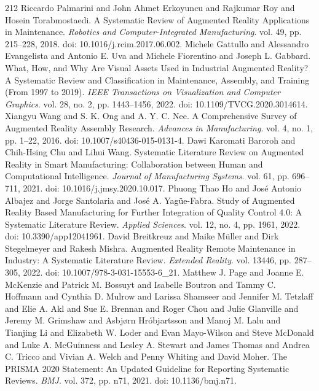 \begin{thebibliography}{212}
 Riccardo Palmarini and John Ahmet Erkoyuncu and Rajkumar Roy and Hosein Torabmostaedi. A Systematic Review of Augmented Reality Applications in Maintenance. \emph{Robotics and Computer-Integrated Manufacturing}. vol. 49, pp. 215--228, 2018. doi: 10.1016/j.rcim.2017.06.002.
 Michele Gattullo and Alessandro Evangelista and Antonio E. Uva and Michele Fiorentino and Joseph L. Gabbard. What, How, and Why Are Visual Assets Used in Industrial Augmented Reality? A Systematic Review and Classification in Maintenance, Assembly, and Training (From 1997 to 2019). \emph{IEEE Transactions on Visualization and Computer Graphics}. vol. 28, no. 2, pp. 1443--1456, 2022. doi: 10.1109/TVCG.2020.3014614.
 Xiangyu Wang and S. K. Ong and A. Y. C. Nee. A Comprehensive Survey of Augmented Reality Assembly Research. \emph{Advances in Manufacturing}. vol. 4, no. 1, pp. 1--22, 2016. doi: 10.1007/s40436-015-0131-4.
 Dawi Karomati Baroroh and Chih-Hsing Chu and Lihui Wang. Systematic Literature Review on Augmented Reality in Smart Manufacturing: Collaboration between Human and Computational Intelligence. \emph{Journal of Manufacturing Systems}. vol. 61, pp. 696--711, 2021. doi: 10.1016/j.jmsy.2020.10.017.
 Phuong Thao Ho and Jos{\'e} Antonio Albajez and Jorge Santolaria and Jos{\'e} A. Yag{\"u}e-Fabra. Study of Augmented Reality Based Manufacturing for Further Integration of Quality Control 4.0: A Systematic Literature Review. \emph{Applied Sciences}. vol. 12, no. 4, pp. 1961, 2022. doi: 10.3390/app12041961.
 David Breitkreuz and Maike M{\"u}ller and Dirk Stegelmeyer and Rakesh Mishra. Augmented Reality Remote Maintenance in Industry: A Systematic Literature Review. \emph{Extended Reality}. vol. 13446, pp. 287--305, 2022. doi: 10.1007/978-3-031-15553-6_21.
 Matthew J. Page and Joanne E. McKenzie and Patrick M. Bossuyt and Isabelle Boutron and Tammy C. Hoffmann and Cynthia D. Mulrow and Larissa Shamseer and Jennifer M. Tetzlaff and Elie A. Akl and Sue E. Brennan and Roger Chou and Julie Glanville and Jeremy M. Grimshaw and Asbj{\o}rn Hr{\'o}bjartsson and Manoj M. Lalu and Tianjing Li and Elizabeth W. Loder and Evan Mayo-Wilson and Steve McDonald and Luke A. McGuinness and Lesley A. Stewart and James Thomas and Andrea C. Tricco and Vivian A. Welch and Penny Whiting and David Moher. The {PRISMA} 2020 Statement: An Updated Guideline for Reporting Systematic Reviews. \emph{BMJ}. vol. 372, pp. n71, 2021. doi: 10.1136/bmj.n71.

\end{thebibliography}
